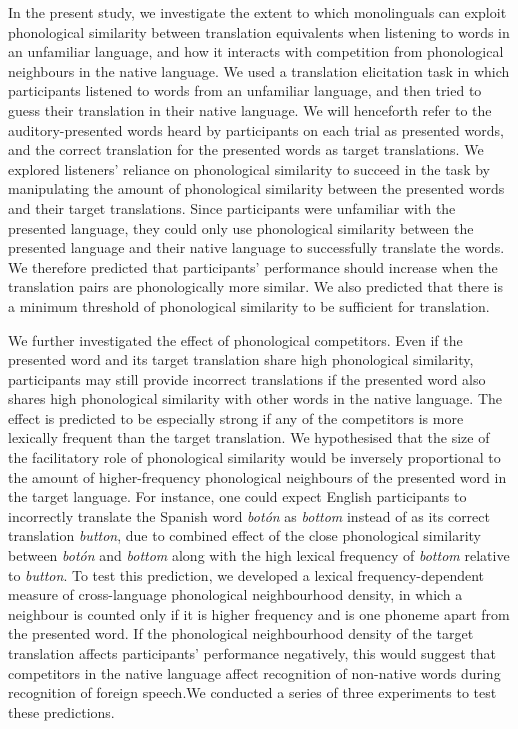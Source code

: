 \documentclass[
]{article}
\begin{document}
In the present study, we investigate the extent to which monolinguals
can exploit phonological similarity between translation equivalents when
listening to words in an unfamiliar language, and how it interacts with
competition from phonological neighbours in the native language. We used
a translation elicitation task in which participants listened to words
from an unfamiliar language, and then tried to guess their translation
in their native language. We will henceforth refer to the
auditory-presented words heard by participants on each trial as
presented words, and the correct translation for the presented words as
target translations. We explored listeners' reliance on phonological
similarity to succeed in the task by manipulating the amount of
phonological similarity between the presented words and their target
translations. Since participants were unfamiliar with the presented
language, they could only use phonological similarity between the
presented language and their native language to successfully translate
the words. We therefore predicted that participants' performance should
increase when the translation pairs are phonologically more similar. We
also predicted that there is a minimum threshold of phonological
similarity to be sufficient for translation.

We further investigated the effect of phonological competitors. Even if
the presented word and its target translation share high phonological
similarity, participants may still provide incorrect translations if the
presented word also shares high phonological similarity with other words
in the native language. The effect is predicted to be especially strong
if any of the competitors is more lexically frequent than the target
translation. We hypothesised that the size of the facilitatory role of
phonological similarity would be inversely proportional to the amount of
higher-frequency phonological neighbours of the presented word in the
target language. For instance, one could expect English participants to
incorrectly translate the Spanish word \emph{botón} as \emph{bottom}
instead of as its correct translation \emph{button}, due to combined
effect of the close phonological similarity between \emph{botón} and
\emph{bottom} along with the high lexical frequency of \emph{bottom}
relative to \emph{button}. To test this prediction, we developed a
lexical frequency-dependent measure of cross-language phonological
neighbourhood density, in which a neighbour is counted only if it is
higher frequency and is one phoneme apart from the presented word. If
the phonological neighbourhood density of the target translation affects
participants' performance negatively, this would suggest that
competitors in the native language affect recognition of non-native
words during recognition of foreign speech.We conducted a series of
three experiments to test these predictions.
\end{document}
